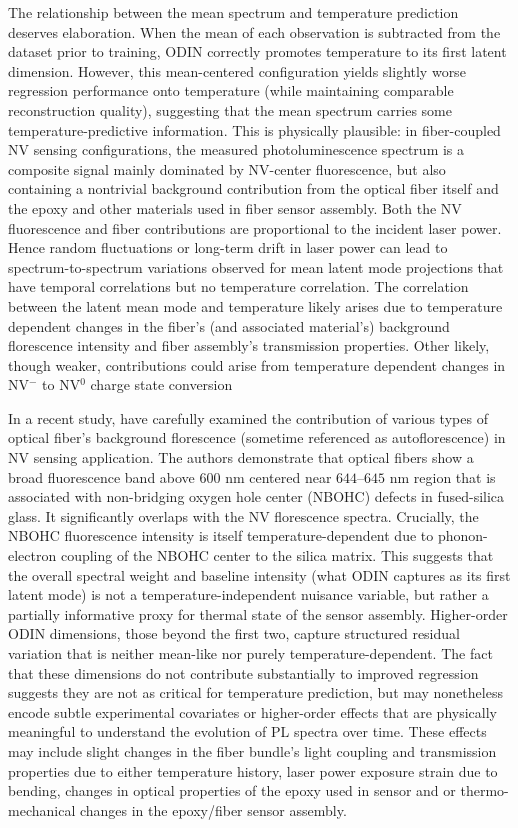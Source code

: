 \documentclass[twoside,11pt]{article}
\begin{document}
The relationship between the mean spectrum and temperature prediction deserves elaboration. When the mean of each observation is subtracted from the dataset prior to training, ODIN correctly promotes temperature to its first latent dimension. However, this mean-centered configuration yields slightly worse regression performance onto temperature (while maintaining comparable reconstruction quality), suggesting that the mean spectrum carries some  temperature-predictive information. This is physically plausible: in fiber-coupled NV sensing configurations, the measured photoluminescence spectrum is a composite signal mainly dominated by NV-center fluorescence, but also containing a nontrivial background contribution from the optical fiber itself and the epoxy and other materials used in fiber sensor assembly. Both the NV fluorescence and fiber contributions are proportional to the incident laser power. Hence random fluctuations or long-term drift in laser power can lead to spectrum-to-spectrum variations observed for mean latent mode projections that have temporal correlations but no temperature correlation.  The correlation between the latent mean mode and  temperature likely arises due to temperature dependent changes in the fiber's (and associated material's) background florescence intensity and fiber assembly's transmission properties. Other likely, though weaker, contributions could arise from temperature dependent changes in NV$^{-}$ to NV$^{0}$ charge state conversion%

In a recent study, \cite{johansson2026characterization} have carefully examined the contribution of various types of optical fiber's background florescence (sometime referenced as autoflorescence) in NV sensing application. The authors demonstrate that optical fibers show a broad fluorescence band above $600$ nm centered near $644–645$ nm region that is associated with non-bridging oxygen hole center (NBOHC) defects in fused-silica glass. It significantly overlaps with the NV florescence spectra. Crucially, the NBOHC fluorescence intensity is itself temperature-dependent due to phonon-electron coupling of the NBOHC center to the silica matrix. This suggests that the overall spectral weight and baseline intensity (what ODIN captures as its first latent mode) is not a temperature-independent nuisance variable, but rather a partially informative proxy for thermal state of the sensor assembly.    
Higher-order ODIN dimensions, those beyond the first two, capture structured residual variation that is neither mean-like nor purely temperature-dependent. The fact that these dimensions do not contribute substantially to improved regression suggests they are not as critical for temperature prediction, but may nonetheless encode subtle experimental covariates or higher-order effects that are physically meaningful to understand the evolution of PL spectra over time. These effects may include slight changes in the fiber bundle's light coupling and transmission properties due to either temperature history, laser power exposure strain due to bending, changes in optical properties of the epoxy used in sensor and or thermo-mechanical changes in the epoxy/fiber sensor assembly.
\end{document}
